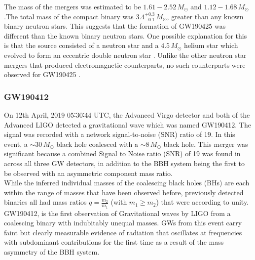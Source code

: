 The mass of the mergers was estimated to be $1.61-2.52\,M_\odot$ and $1.12 - 1.68\,M_\odot$.The total mass of the compact binary was $3.4_{-0.1}^{+0.3}\, M_\odot$, greater than any known binary neutron stars. This suggests that the formation of GW190425 was different than the known binary neutron stars. One possible explanation for this is that the source consisted of a neutron star and a $4.5\,M_\odot$ helium star which evolved to form an eccentric double neutron star \cite{Romero_Shaw_2020}. Unlike the other neutron star mergers that produced electromagnetic counterparts, no such counterparts were observed for GW190425 \cite{GW190425_1}.

\pagebreak

\subsubsection{GW190412}

On 12th April, 2019 05∶30∶44 UTC, the Advanced Virgo detector and both of the Advanced LIGO detected a gravitational wave which was named GW190412. The signal was recorded with a network signal-to-noise (SNR) ratio of 19. In this event, a $\sim 30\, M_\odot$ black hole coalesced with a $\sim 8\,M_\odot$ black hole. This merger was significant because a combined Signal to Noise ratio (SNR) of 19 was found in across all three GW detectors, in addition to the BBH system being the first to be observed with an asymmetric component mass ratio.\\

While the inferred individual masses of the coalescing black holes (BHs) are each within the range of masses that have been observed before, previously detected binaries all had mass ratios $ q = \frac{m_2}{m_1}$ (with $m_1 \geq m_2$) that were according to unity. GW190412, is the first observation of Gravitational waves by LIGO from a coalescing binary with indubitably unequal masses. GWs from this event carry faint but clearly measurable evidence of radiation that oscillates at frequencies with subdominant contributions for the first time as a result of the mass asymmetry of the BBH system.

